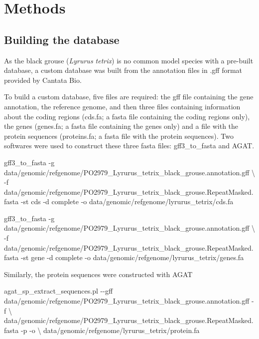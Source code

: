 \documentclass[
  letterpaper,
  DIV=11,
  numbers=noendperiod]{scrreprt}
\newenvironment{Shaded}{}{}
\newcommand{\NormalTok}[1]{\textcolor[rgb]{0.14,0.16,0.18}{#1}}
\begin{document}
\hypertarget{methods}{%
\section{Methods}\label{methods}}

\hypertarget{building-the-database}{%
\subsection{Building the database}\label{building-the-database}}

As the black grouse (\emph{Lyrurus tetrix}) is no common model species
with a pre-built database, a custom database was built from the
annotation files in .gff format provided by Cantata Bio.

To build a custom database, five files are required: the gff file
containing the gene annotation, the reference genome, and then three
files containing information about the coding regions (cds.fa; a fasta
file containing the coding regions only), the genes (genes.fa; a fasta
file containing the genes only) and a file with the protein sequences
(proteins.fa; a fasta file with the protein sequences). Two softwares
were used to construct these three fasta files: gff3\_to\_fasta and
AGAT.

\begin{Shaded}
\begin{Highlighting}[]
\NormalTok{gff3\_to\_fasta {-}g data/genomic/refgenome/PO2979\_Lyrurus\_tetrix\_black\_grouse.annotation.gff \textbackslash{}}
\NormalTok{    {-}f data/genomic/refgenome/PO2979\_Lyrurus\_tetrix\_black\_grouse.RepeatMasked.fasta {-}st cds {-}d complete {-}o data/genomic/refgenome/lyrurus\_tetrix/cds.fa }

\NormalTok{gff3\_to\_fasta {-}g data/genomic/refgenome/PO2979\_Lyrurus\_tetrix\_black\_grouse.annotation.gff \textbackslash{}}
\NormalTok{    {-}f data/genomic/refgenome/PO2979\_Lyrurus\_tetrix\_black\_grouse.RepeatMasked.fasta {-}st gene {-}d complete {-}o data/genomic/refgenome/lyrurus\_tetrix/genes.fa }
\end{Highlighting}
\end{Shaded}

Similarly, the protein sequences were constructed with AGAT

\begin{Shaded}
\begin{Highlighting}[]
\NormalTok{agat\_sp\_extract\_sequences.pl {-}{-}gff data/genomic/refgenome/PO2979\_Lyrurus\_tetrix\_black\_grouse.annotation.gff {-}f \textbackslash{}}
\NormalTok{    data/genomic/refgenome/PO2979\_Lyrurus\_tetrix\_black\_grouse.RepeatMasked.fasta {-}p {-}o \textbackslash{}}
\NormalTok{    data/genomic/refgenome/lyrurus\_tetrix/protein.fa}
\end{Highlighting}
\end{Shaded}
\end{document}
